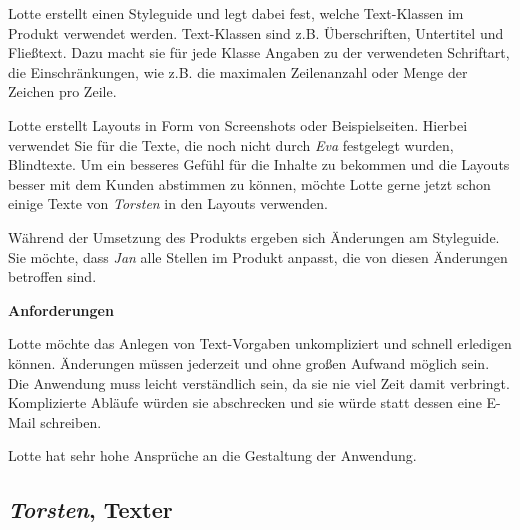 \begin{multicols}{2}
Lotte erstellt einen Styleguide und legt dabei fest, welche Text-Klassen im Produkt verwendet werden. Text-Klassen sind z.B. Überschriften, Untertitel und Fließtext. Dazu macht sie für jede Klasse Angaben zu der verwendeten Schriftart, die Einschränkungen, wie z.B. die maximalen Zeilenanzahl oder Menge der Zeichen pro Zeile.

Lotte erstellt Layouts in Form von Screenshots oder Beispielseiten. Hierbei verwendet Sie für die Texte, die noch nicht durch \emph{Eva} festgelegt wurden, Blindtexte. Um ein besseres Gefühl für die Inhalte zu bekommen und die Layouts besser mit dem Kunden abstimmen zu können, möchte Lotte gerne jetzt schon einige Texte von \emph{Torsten} in den Layouts verwenden.

Während der Umsetzung des Produkts ergeben sich Änderungen am Styleguide. Sie möchte, dass \emph{Jan} alle Stellen im Produkt anpasst, die von diesen Änderungen betroffen sind.

\textbf{Anforderungen}

Lotte möchte das Anlegen von Text-Vorgaben unkompliziert und schnell erledigen können. Änderungen müssen jederzeit und ohne großen Aufwand möglich sein. Die Anwendung muss leicht verständlich sein, da sie nie viel Zeit damit verbringt. Komplizierte Abläufe würden sie abschrecken und sie würde statt dessen eine E-Mail schreiben.

Lotte hat sehr hohe Ansprüche an die Gestaltung der Anwendung.

\end{multicols}

\pagebreak

\subsection{\emph{Torsten}, Texter}\label{p:torsten}

